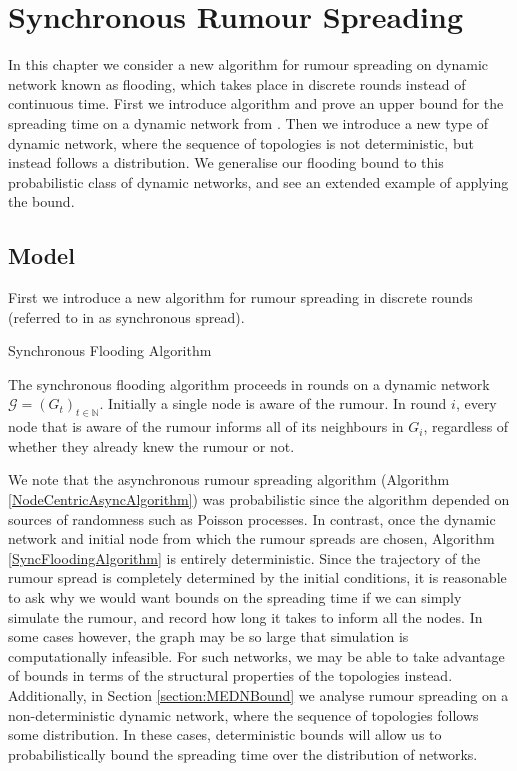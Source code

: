\chapter{Synchronous Rumour Spreading}
\label{chapter:SyncFlooding}

In this chapter we consider a new algorithm for rumour spreading on dynamic network known as flooding, which takes place in discrete rounds instead of continuous time. First we introduce algorithm and prove an upper bound for the spreading time on a dynamic network from \cite{syncPaper}. Then we introduce a new type of dynamic network, where the sequence of topologies is not deterministic, but instead follows a distribution. We generalise our flooding bound to this probabilistic class of dynamic networks, and see an extended example of applying the bound.

\section{Model}

First we introduce a new algorithm for rumour spreading in discrete rounds (referred to in \cite{asyncPaper} as synchronous spread).

\begin{definition} \label{SyncFloodingAlgorithm}
	Synchronous Flooding Algorithm

	\noindent
	The synchronous flooding algorithm proceeds in rounds on a dynamic network $\mathcal{G} = (G_t)_{t \in \mathbb{N}}$. Initially a single node is aware of the rumour. In round $i$, every node that is aware of the rumour informs all of its neighbours in $G_i$, regardless of whether they already knew the rumour or not.
\end{definition}

We note that the asynchronous rumour spreading algorithm (Algorithm \ref{NodeCentricAsyncAlgorithm}) was probabilistic since the algorithm depended on sources of randomness such as Poisson processes. In contrast, once the dynamic network and initial node from which the rumour spreads are chosen, Algorithm \ref{SyncFloodingAlgorithm} is entirely deterministic. Since the trajectory of the rumour spread is completely determined by the initial conditions, it is reasonable to ask why we would want bounds on the spreading time if we can simply simulate the rumour, and record how long it takes to inform all the nodes. In some cases however, the graph may be so large that simulation is computationally infeasible. 
For such networks, we may be able to take advantage of bounds in terms of the structural properties of the topologies instead.
Additionally, in Section \ref{section:MEDNBound}
we analyse rumour spreading on a non-deterministic dynamic network, where the sequence of topologies follows some distribution. 
In these cases, deterministic bounds will allow us to probabilistically bound the spreading time over the distribution of networks. 

